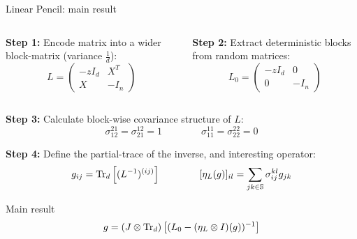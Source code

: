 \documentclass[10pt]{beamer}
\begin{document}
\begin{frame}{Linear Pencil: main result}
  \begin{columns}[T]
    \begin{column}{0.45\textwidth}
  \textbf{Step 1:} Encode matrix into a wider block-matrix (variance $\frac{1}{d}$):
  \begin{equation*}
    L = \begin{pmatrix}
      -z I_d & X^T\\
      X & - I_n
    \end{pmatrix}
  \end{equation*}
\end{column}
\begin{column}{0.45\textwidth}

  \textbf{Step 2:} Extract deterministic blocks from random matrices:
  \begin{equation*}
    L_0 = \begin{pmatrix}
      -z I_d& 0\\
      0 & -I_n
    \end{pmatrix}
  \end{equation*}
  \end{column}
  \end{columns}
    
  \textbf{Step 3:} Calculate block-wise covariance structure of $L$:
  $$
  \sigma_{12}^{21} = \sigma_{21}^{12} = 1 
  \qquad
  \qquad
  \sigma_{11}^{11} = \sigma_{22}^{22} = 0
  $$


  \textbf{Step 4:} Define the partial-trace of the inverse, and interesting operator:
  \begin{equation*}
    g_{ij} = \traceLim[d]{
      (L^{-1})^{(ij)}
    }
    \qquad \qquad
    [\eta_L(g)]_{il} = \sum_{jk \in \mathbb S} \sigma_{ij}^{kl} g_{jk}
  \end{equation*}

  \begin{block}{Main result \cite{spectra,mingo2017free}}
    \begin{equation}\label{eq:main-result-linear-pencil}
        g = \traceLimOp[d]{
            (L_0 - (\eta_L \otimes I)(g))^{-1}
        }
    \end{equation}
  \end{block}
\end{frame}
\end{document}
